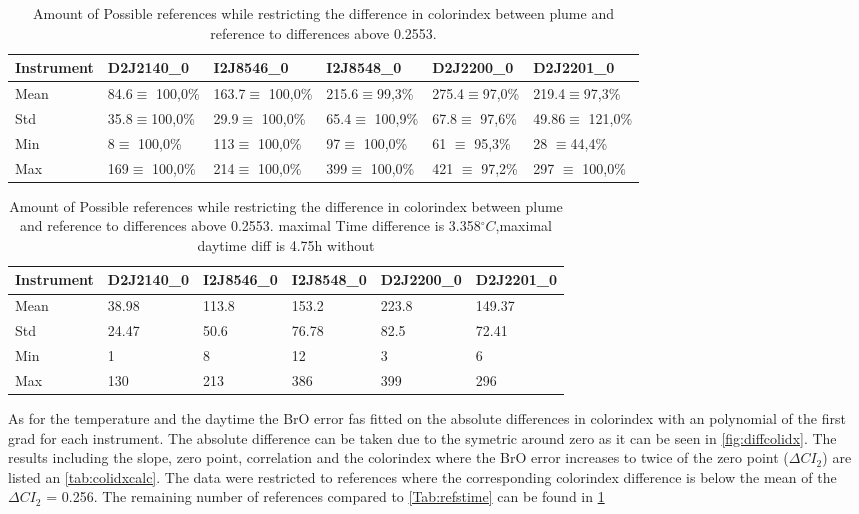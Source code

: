 \documentclass  [
  paper    = a4,
  BCOR     = 10mm,
  twoside,
  fontsize = 12pt,
  fleqn,
  toc      = bibnumbered,
  toc      = listofnumbered,
  numbers  = noendperiod,
  headings = normal,
  listof   = leveldown,
  version  = 3.03
]                                       {scrreprt}
\begin{document}
	\begin{table}[h]
	\begin{tabular}{|p{2cm}|p{2cm}|p{2cm}|p{2cm}|p{2cm}|p{2cm}|}
		Instrument	&D2J2140\_0&I2J8546\_0& I2J8548\_0&D2J2200\_0&D2J2201\_0\\
		\toprule
		Mean&
		84.6$\equiv$ 100,0\% &	163.7$\equiv$ 100,0\%&	215.6$\equiv$99,3\%&
		275.4$\equiv$97,0\% &219.4$\equiv$97,3\% \\
		\midrule
		Std&
		35.8$\equiv$100,0\% &	29.9$\equiv$	100,0\% &
		65.4$\equiv$	100,9\%&
		67.8$\equiv$	97,6\% &
		49.86$\equiv$	121,0\% \\
		\midrule
		Min&
		8$\equiv$	100,0\% &
		113$\equiv$	100,0\% 
		&97$\equiv$	100,0\% 
		&61 $\equiv$	95,3\% 
		&28	$\equiv$44,4\% \\
		\midrule
		Max
		&169$\equiv$	100,0\% 
		&214$\equiv$	100,0\% 
		&399$\equiv$	100,0\% 
		&421 $\equiv$	97,2\% 
		&297 $\equiv$	100,0\%  \\
		\bottomrule
	\end{tabular}
	\caption{Amount of Possible references while restricting the difference in colorindex  between plume and reference to differences above 0.2553.}
	\label{tab:colidxres}
\end{table}	


	\begin{table}
	\begin{tabular}{|p{2cm}|p{2cm}|p{2cm}|p{2cm}|p{2cm}|p{2cm}|}
		Instrument	&D2J2140\_0&I2J8546\_0& I2J8548\_0&D2J2200\_0&D2J2201\_0\\
		\toprule
		Mean&38.98&113.8&153.2&223.8&149.37\\
		\midrule
		Std&
		24.47&
		50.6&
		76.78&
		82.5&
		72.41\\
		\midrule
		Min&1&8&12&3 &6\\
		\midrule
		Max&130&213&386&399 &296\\
		\bottomrule
	\end{tabular}
	\caption{Amount of Possible references while restricting the difference in colorindex  between plume and reference to differences above 0.2553. maximal Time difference is 3.358$^{\circ}C$,maximal daytime diff is 4.75h without}
\end{table}	
As for the temperature and the daytime the BrO error fas fitted on the absolute differences in colorindex with an polynomial of the first grad for each instrument. The absolute difference can be taken due to the symetric around zero as it  can be seen in \cref{fig:diffcolidx}. The results including the slope, zero point, correlation and the colorindex where the BrO error increases to twice of the zero point ($\Delta CI_{2}$) are listed an \cref{tab:colidxcalc}.
The data were restricted to references where the corresponding colorindex difference is below the mean of the $\Delta CI_{2}$ = 0.256. The remaining number of references compared to \cref{Tab:refstime} can be found in \cref{tab:colidxres}
\end{document}
